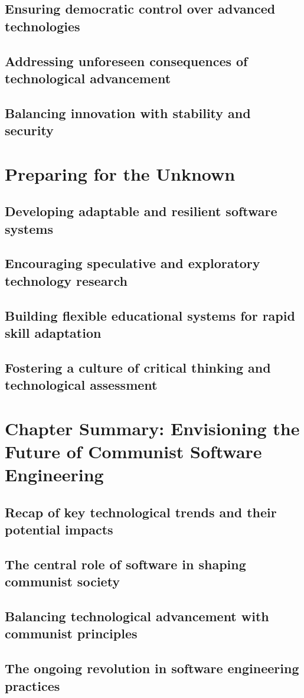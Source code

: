 \subsection{Ensuring democratic control over advanced technologies}
\subsection{Addressing unforeseen consequences of technological advancement}
\subsection{Balancing innovation with stability and security}

\newpage

\section{Preparing for the Unknown}
\subsection{Developing adaptable and resilient software systems}
\subsection{Encouraging speculative and exploratory technology research}
\subsection{Building flexible educational systems for rapid skill adaptation}
\subsection{Fostering a culture of critical thinking and technological assessment}

\newpage

\section{Chapter Summary: Envisioning the Future of Communist Software Engineering}
\subsection{Recap of key technological trends and their potential impacts}
\subsection{The central role of software in shaping communist society}
\subsection{Balancing technological advancement with communist principles}
\subsection{The ongoing revolution in software engineering practices}